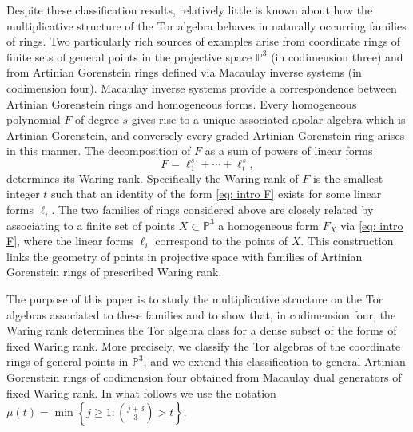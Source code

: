 \documentclass[reqno]{amsart}
\renewcommand{\P}{\mathbb{P}}
\theoremstyle{plain} %
\theoremstyle{definition}
\theoremstyle{remark}
\begin{document}
Despite these classification results, relatively little is known about how the
multiplicative structure of the Tor algebra behaves in naturally occurring
families of rings. Two particularly rich sources of examples arise from coordinate rings of finite sets of
general points in the projective space $\P^3$ (in codimension three) and from Artinian Gorenstein rings defined via
Macaulay inverse systems (in codimension four). 
Macaulay inverse systems provide a correspondence between
Artinian Gorenstein rings and homogeneous forms. Every homogeneous polynomial $F$ of degree $s$ gives rise to a unique associated apolar algebra which is Artinian Gorenstein, and conversely every graded Artinian Gorenstein ring arises in this manner. 
The decomposition of $F$ as a sum of  powers of linear forms 
\begin{equation}\label{eq: intro F}
F= \ell_1^{s} + \cdots + \ell_t^{s},
\end{equation}
determines its
Waring rank. Specifically the Waring rank of $F$ is the smallest integer $t$ such that an identity of the form \eqref{eq: intro F} exists for some linear forms $\ell_i$.
The two families of rings considered above are closely related by associating to a finite set of points
$X \subset \mathbb{P}^3$ a homogeneous form $F_X$ via \eqref{eq: intro F}, where the linear forms $\ell_i$ correspond to the points of $X$. This construction links
the geometry of points in projective space with families of Artinian Gorenstein
rings of prescribed Waring rank.

The purpose of this paper is to study the multiplicative structure on the Tor
algebras associated to these families and to show that, in codimension four, the Waring rank determines the Tor algebra class for a dense subset of the forms of fixed Waring rank.
More precisely, we classify the Tor algebras of the coordinate rings of general
points in $\mathbb{P}^3$, and we extend this classification to general
Artinian Gorenstein rings of codimension four obtained from Macaulay dual
generators of fixed Waring rank. In what follows we use the notation $\mu(t) =\min\left\{j\ge1:\binom{j+3}{3}>t\right\}$.
\end{document}
